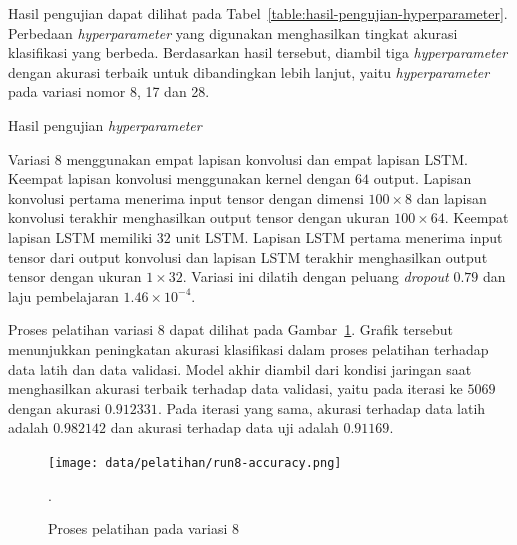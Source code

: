 Hasil pengujian dapat dilihat pada Tabel~\ref{table:hasil-pengujian-hyperparameter}. Perbedaan \textit{hyperparameter} yang digunakan menghasilkan tingkat akurasi klasifikasi yang berbeda. Berdasarkan hasil tersebut, diambil tiga \textit{hyperparameter} dengan akurasi terbaik untuk dibandingkan lebih lanjut, yaitu \textit{hyperparameter} pada variasi nomor 8, 17 dan 28.

\begin{table}[h!]
    \centering
    \caption{Hasil pengujian \textit{hyperparameter}}
    \label{table:hasil-pengujian-hyperparameter}
\end{table}

Variasi 8 menggunakan empat lapisan konvolusi dan empat lapisan LSTM\@. Keempat lapisan konvolusi menggunakan kernel dengan $64$ output. Lapisan konvolusi pertama menerima input tensor dengan dimensi $100 \times 8$ dan lapisan konvolusi terakhir menghasilkan output tensor dengan ukuran $100 \times 64$. Keempat lapisan LSTM memiliki $32$ unit LSTM\@. Lapisan LSTM pertama menerima input tensor dari output konvolusi dan lapisan LSTM terakhir menghasilkan output tensor dengan ukuran $1 \times 32$. Variasi ini dilatih dengan peluang \textit{dropout} $0.79$ dan laju pembelajaran $1.46 \times 10^{-4}$.

Proses pelatihan variasi 8 dapat dilihat pada Gambar~\ref{gambar:run8-training}. Grafik tersebut menunjukkan peningkatan akurasi klasifikasi dalam proses pelatihan terhadap data latih dan data validasi. Model akhir diambil dari kondisi jaringan saat menghasilkan akurasi terbaik terhadap data validasi, yaitu pada iterasi ke $5069$ dengan akurasi $0.912331$. Pada iterasi yang sama, akurasi terhadap data latih adalah $0.982142$ dan akurasi terhadap data uji adalah $0.91169$.

\begin{figure}[h!]
    \centering
    \texttt{[image: data/pelatihan/run8-accuracy.png]}
    \caption{Proses pelatihan pada variasi 8}.
    \label{gambar:run8-training}
\end{figure}


